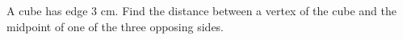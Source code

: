 \begin{frame}

\begin{example}
A cube has edge $3$ cm. Find the distance between a vertex of the cube and the midpoint of one of the three opposing sides. 
\end{example}
\end{frame}
